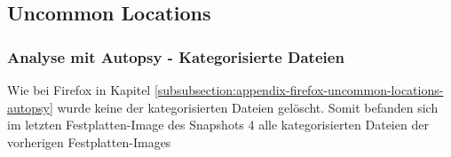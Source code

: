 \begin{appendices}
		
		
		\subsection{Uncommon Locations}
		\label{subsection:appendix-tor-uncommon-locations}
		
		\subsubsection*{Analyse mit Autopsy - Kategorisierte Dateien}
		\label{subsubsection:appendix-tor-uncommon-locations-autopsy}
		
		Wie bei Firefox in Kapitel \ref{subsubsection:appendix-firefox-uncommon-locations-autopsy} wurde keine der kategorisierten Dateien gelöscht. Somit befanden sich im letzten Festplatten-Image des Snapshots 4 alle kategorisierten Dateien der vorherigen Festplatten-Images
		

\end{appendices}
